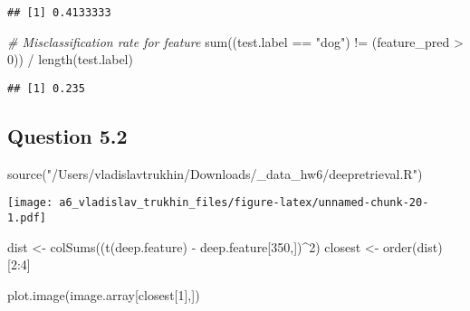 \documentclass[
]{article}
\newenvironment{Shaded}{\begin{snugshade}}{\end{snugshade}}
\newcommand{\CommentTok}[1]{\textcolor[rgb]{0.56,0.35,0.01}{\textit{#1}}}
\newcommand{\DecValTok}[1]{\textcolor[rgb]{0.00,0.00,0.81}{#1}}
\newcommand{\FunctionTok}[1]{\textcolor[rgb]{0.00,0.00,0.00}{#1}}
\newcommand{\NormalTok}[1]{#1}
\newcommand{\OtherTok}[1]{\textcolor[rgb]{0.56,0.35,0.01}{#1}}
\newcommand{\SpecialCharTok}[1]{\textcolor[rgb]{0.00,0.00,0.00}{#1}}
\newcommand{\StringTok}[1]{\textcolor[rgb]{0.31,0.60,0.02}{#1}}
\begin{document}
\begin{verbatim}
## [1] 0.4133333
\end{verbatim}

\begin{Shaded}
\begin{Highlighting}[]
\CommentTok{\# Misclassification rate for feature}
\FunctionTok{sum}\NormalTok{((test.label }\SpecialCharTok{==} \StringTok{"dog"}\NormalTok{) }\SpecialCharTok{!=}\NormalTok{ (feature\_pred }\SpecialCharTok{\textgreater{}} \DecValTok{0}\NormalTok{)) }\SpecialCharTok{/} \FunctionTok{length}\NormalTok{(test.label)}
\end{Highlighting}
\end{Shaded}

\begin{verbatim}
## [1] 0.235
\end{verbatim}

\hypertarget{question-5.2}{%
\subsection{Question 5.2}\label{question-5.2}}

\begin{Shaded}
\begin{Highlighting}[]
\FunctionTok{source}\NormalTok{(}\StringTok{"/Users/vladislavtrukhin/Downloads/\_data\_hw6/deepretrieval.R"}\NormalTok{)}
\end{Highlighting}
\end{Shaded}

\texttt{[image: a6\_vladislav\_trukhin\_files/figure-latex/unnamed-chunk-20-1.pdf]}

\begin{Shaded}
\begin{Highlighting}[]
\NormalTok{dist }\OtherTok{\textless{}{-}} \FunctionTok{colSums}\NormalTok{((}\FunctionTok{t}\NormalTok{(deep.feature) }\SpecialCharTok{{-}}\NormalTok{ deep.feature[}\DecValTok{350}\NormalTok{,])}\SpecialCharTok{\^{}}\DecValTok{2}\NormalTok{)}
\NormalTok{closest }\OtherTok{\textless{}{-}} \FunctionTok{order}\NormalTok{(dist)[}\DecValTok{2}\SpecialCharTok{:}\DecValTok{4}\NormalTok{]}
\end{Highlighting}
\end{Shaded}

\begin{Shaded}
\begin{Highlighting}[]
\FunctionTok{plot.image}\NormalTok{(image.array[closest[}\DecValTok{1}\NormalTok{],])}
\end{Highlighting}
\end{Shaded}
\end{document}
